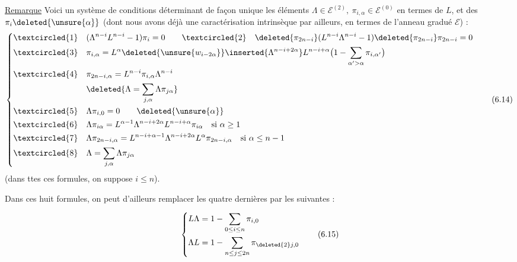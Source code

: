 \uline{Remarque} Voici un système de conditions déterminant de façon unique les éléments $\Lambda\in\mathcal E^{(2)},\ \pi_{i,\alpha}\in\mathcal E^{(0)}$ en termes de $L$, et des $\pi_i\deleted{\unsure{\alpha}}$ (dont nous avons déjà une caractérisation intrinsèque par ailleurs, en termes de l'anneau gradué $\mathcal E$) :
\[
\left\{\begin{aligned}
\textcircled{1}\quad &(\Lambda^{n-i}L^{n-i}-1)\pi_i=0
\qquad\textcircled{2}\quad\deleted{\pi_{2n-i}}(L^{n-i}\Lambda^{n-i}-1)\deleted{\pi_{2n-i}}\pi_{2n-i}=0\\
\textcircled{3}\quad &\pi_{i,\alpha}=L^\alpha\deleted{\unsure{w_{i-2\alpha}}}\inserted{\Lambda^{n-i+2\alpha}}L^{n-i+\alpha}\bigl(1-\sum_{\alpha'>\alpha}\pi_{i,\alpha'}\bigr)\\
\textcircled{4}\quad &\pi_{2n-i,\alpha}=L^{n-i}\pi_{i,\alpha}\Lambda^{n-i}\\
&\deleted{\Lambda=\sum_{j,\alpha}\Lambda\pi_{j\alpha}}\\
\textcircled{5}\quad &\Lambda\pi_{i,0}=0\qquad\deleted{\unsure{\alpha}}\\
\textcircled{6}\quad &\Lambda\pi_{i\alpha}=L^{\alpha-1}\Lambda^{n-i+2\alpha}L^{n-i+\alpha}\pi_{i\alpha}\quad\text{si }\alpha\geq1\\
\textcircled{7}\quad &\Lambda\pi_{2n-i,\alpha}=L^{n-i+\alpha-1}\Lambda^{n-i+2\alpha}L^\alpha\pi_{2n-i,\alpha}\quad\text{si }\alpha\leq n-1\\
\textcircled{8}\quad &\Lambda=\sum_{j,\alpha}\Lambda\pi_{j\alpha}
\end{aligned}\right.
\tag{6.14}
\]
(dans ttes ces formules, on suppose $i\leq n$).

Dans ces huit formules, on peut d'ailleurs remplacer les quatre dernières par les suivantes  :

\[
\left\{\begin{aligned}
L\Lambda&=1-\sum_{0\leq i\leq n}\pi_{i,0}\\
\Lambda L&=1-\sum_{n\leq j\leq2n}\pi_{\deleted{2}j,0}
\end{aligned}\right.
\tag{6.15}
\]

